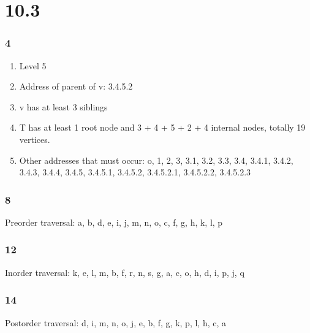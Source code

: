 \documentclass[12pt]{article}
\begin{document}
  \part*{10.3}
    \section*{4}
      \begin{enumerate}[label=\alph*)]
        \item Level 5
        \item Address of parent of v: 3.4.5.2
        \item v has at least 3 siblings
        \item T has at least 1 root node and 3 + 4 + 5 + 2 + 4 internal nodes, totally 19 vertices.
        \item Other addresses that must occur: o, 1, 2, 3, 3.1, 3.2, 3.3, 3.4, 3.4.1, 3.4.2, 3.4.3, 3.4.4, 3.4.5, 3.4.5.1, 3.4.5.2, 3.4.5.2.1, 3.4.5.2.2, 3.4.5.2.3
      \end{enumerate}
    \section*{8}
      Preorder traversal: a, b, d, e, i, j, m, n, o, c, f, g, h, k, l, p
    \section*{12}
      Inorder traversal: k, e, l, m, b, f, r, n, s, g, a, c, o, h, d, i, p, j, q
    \section*{14}
      Postorder traversal: d, i, m, n, o, j, e, b, f, g, k, p, l, h, c, a
\end{document}
